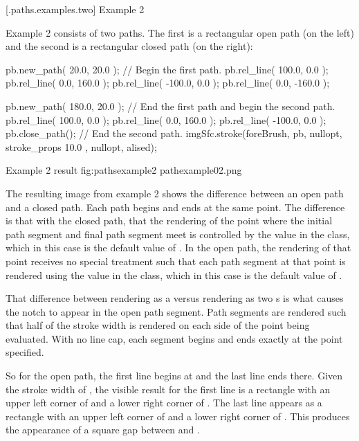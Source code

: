 \FloatBarrier

 [\iotwod.paths.examples.two] {Example 2}

\pnum
Example 2 consists of two paths. The first is a rectangular open path (on the left) and the second is a rectangular closed path (on the right):

\begin{codeblock}
  pb.new_path({ 20.0, 20.0 }); // Begin the first path.
  pb.rel_line({ 100.0, 0.0 });
  pb.rel_line({ 0.0, 160.0 });
  pb.rel_line({ -100.0, 0.0 });
  pb.rel_line({ 0.0, -160.0 });
  
  pb.new_path({ 180.0, 20.0 }); // End the first path and begin the second path.
  pb.rel_line({ 100.0, 0.0 });
  pb.rel_line({ 0.0, 160.0 });
  pb.rel_line({ -100.0, 0.0 });
  pb.close_path(); // End the second path.
  imgSfc.stroke(foreBrush, pb, nullopt, stroke_props{ 10.0 }, nullopt, alised);
\end{codeblock}

\begin{importgraphiciotwod}
{Example 2 result}
{fig:pathsexample2}
{pathexample02.png}
\end{importgraphiciotwod}

\FloatBarrier

\pnum
The resulting image from example 2 shows the difference between an open path and a closed path. Each path begins and ends at the same point. The difference is that with the closed path, that the rendering of the point where the initial path segment and final path segment meet is controlled by the  value in the  class, which in this case is the default value of . In the open path, the rendering of that point receives no special treatment such that each path segment at that point is rendered using the  value in the  class, which in this case is the default value of .

\pnum
That difference between rendering as a  versus rendering as two s is what causes the notch to appear in the open path segment. Path segments are rendered such that half of the stroke width is rendered on each side of the point being evaluated. With no line cap, each segment begins and ends exactly at the point specified.

\pnum
So for the open path, the first line begins at  and the last line ends there. Given the stroke width of , the visible result for the first line is a rectangle with an upper left corner of  and a lower right corner of . The last line appears as a rectangle with an upper left corner of  and a lower right corner of . This produces the appearance of a square gap between  and .

